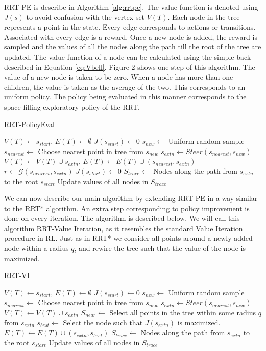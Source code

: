 \documentclass{article} %
\begin{document}
RRT-PE is describe in Algorithm \ref{alg:rrtpe}. The value function is denoted using $J(s)$ to avoid confusion with the vertex set $V(T)$.
Each node in the tree represents a point in the state. Every edge corresponds to actions or transitions. Associated with every edge is a reward. Once a new node is added, the reward is sampled and the values of all the nodes along the path till the root of the tree are updated. The value function of a node can be calculated using the simple back described in Equation \ref{eq:Vbell}. Figure 2 shows one step of this algorithm. The value of a new node is taken to be zero. When a node has more than one children, the value is taken as the average of the two. This corresponds to an uniform policy. The policy being evaluated in this manner corresponds to the space filling exploratory policy of the RRT.


\begin{algorithm}
\caption{RRT-PolicyEval}
\label{alg:rrtpe}
\begin{algorithmic}[1]
\State $V(T)\leftarrow s_{start},\,E(T)\leftarrow \emptyset$
\State $J(s_{start}) \leftarrow 0$
\Repeat 
	\State $s_{new}\leftarrow $ Uniform random sample
	\State $s_{nearest}\leftarrow $ Choose nearest point in tree from $s_{new}$
	\State $s_{extn} \leftarrow Steer(s_{nearest},s_{new})$
	\State $V(T)\leftarrow V(T) \cup s_{extn},\,E(T) \leftarrow E(T) \cup (s_{nearest},s_{extn})$
	\State $r\leftarrow \mathcal{G}(s_{nearest},s_{extn})$
	\State $J(s_{start}) \leftarrow 0$
	\State $S_{trace}\leftarrow$ Nodes along the path from $s_{extn}$ to the root $s_{start}$
	\State Update values of all nodes in $S_{trace}$ 
\end{algorithmic}
\end{algorithm}

We can now describe our main algorithm by extending RRT-PE in a way similar to the RRT* algorithm. An extra step corresponding to policy improvement is done on every iteration. The algorithm is described below. We will call this algorithm RRT-Value Iteration, as it resembles the standard Value Iteration procedure in RL. Just as in RRT* we consider all points around a newly added node within a radius $q$, and rewire the tree such that the value of the node is maximized.
\begin{algorithm}
\caption{RRT-VI}
\label{alg:rrtpe}
\begin{algorithmic}[1]
\State $V(T)\leftarrow s_{start},\,E(T)\leftarrow \emptyset$
\State $J(s_{start}) \leftarrow 0$
\Repeat 
	\State $s_{new}\leftarrow $ Uniform random sample
	\State $s_{nearest}\leftarrow $ Choose nearest point in tree from $s_{new}$
	\State $s_{extn} \leftarrow Steer(s_{nearest},s_{new})$
	\State $V(T)\leftarrow V(T) \cup s_{extn}$
	\State $S_{near}\leftarrow $ Select all points in the tree within some radius $q$ from $s_{extn}$
	\State $s_{best} \leftarrow $ Select the node such that $J(s_{extn})$ is maximized.
	\State $E(T)\leftarrow E(T) \cup (s_{extn},s_{best})$
	\State $S_{trace}\leftarrow$ Nodes along the path from $s_{extn}$ to the root $s_{start}$
	\State Update values of all nodes in $S_{trace}$ 
\end{algorithmic}
\end{algorithm}
\end{document}
